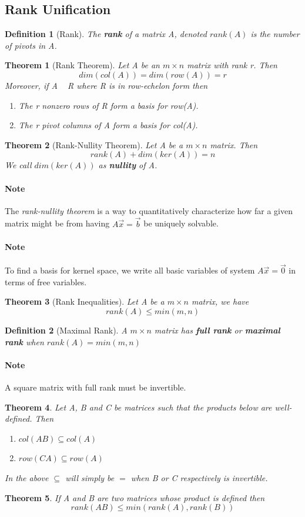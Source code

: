 \documentclass[11pt]{article}
\newtheorem{theorem}{Theorem}
\newtheorem{definition}{Definition}
\begin{document}
	\subsection{Rank Unification}
	\begin{definition}[Rank]
		The \textbf{rank} of a matrix A, denoted $rank(A)$ is the number of pivots in A.
	\end{definition}
	\begin{theorem}[Rank Theorem]
		Let A be an $m\times n$ matrix with rank r. Then
		\[
			dim(col(A)) = dim(row(A)) = r
		\]
		Moreover, if A ~ R where R is in row-echelon form then
		\begin{enumerate}
			\item The r nonzero rows of R form a basis for row(A).
			\item The r pivot columns of A form a basis for col(A).
		\end{enumerate}
	\end{theorem}
	\begin{theorem}[Rank-Nullity Theorem]
		Let A be a $m \times n$ matrix. Then
		\[
			rank(A) + dim(ker(A)) = n
		\]
		We call $dim(ker(A))$ as \textbf{nullity} of A.
	\end{theorem}
	\paragraph{Note} The \emph{rank-nullity theorem} is a way to quantitatively characterize how far a given matrix might be from having $A\vec{x} = \vec{b}$ be uniquely solvable.
	\paragraph{Note} To find a basis for kernel space, we write all basic variables of system $A\vec{x} = \vec{0}$ in terms of free variables.
	\begin{theorem}[Rank Inequalities]
		Let A be a $m \times n$ matrix, we have
		\[
			rank(A) \leq min(m,n)
		\]
	\end{theorem}
	\begin{definition}[Maximal Rank]
		A $m \times n$ matrix has \textbf{full rank} or \textbf{maximal rank} when $rank(A) = min(m,n)$
	\end{definition}
	\paragraph{Note} A square matrix with full rank must be invertible.
	\begin{theorem}
		Let A, B and C be matrices such that the products below are well-defined. Then
		\begin{enumerate}
			\item $col(AB) \subseteq col(A)$
			\item $row(CA) \subseteq row(A)$
		\end{enumerate}
		In the above $\subseteq$ will simply be $=$ when B or C respectively is invertible.
	\end{theorem}
	\begin{theorem}
		If A and B are two matrices whose product is defined then
		\[
			rank(AB) \leq min(rank(A), rank(B))
		\]
	\end{theorem}
\end{document}
